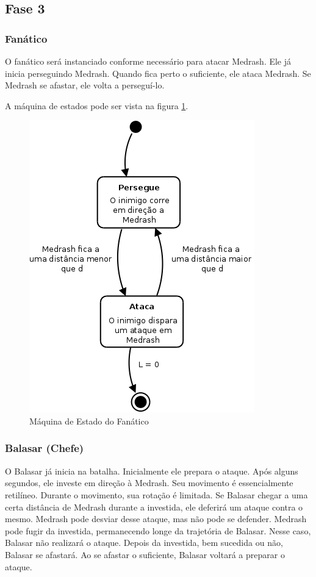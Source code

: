 \subsection{Fase 3}

\subsubsection{Fanático}

O fanático será instanciado conforme necessário para atacar Medrash.
Ele já inicia perseguindo Medrash. Quando fica perto o suficiente, ele
ataca Medrash. Se Medrash se afastar, ele volta a perseguí-lo.

A máquina de estados pode ser vista na figura \ref{fsm:fanatico}.

\begin{figure}[!ht]
 \centering
 \includegraphics[scale=0.35]{ia_fanatico.png}
 \caption{Máquina de Estado do Fanático}
 \label{fsm:fanatico}
\end{figure}

\subsubsection{Balasar (Chefe)}

O Balasar já inicia na batalha. Inicialmente ele prepara o ataque.
Após alguns segundos, ele investe em direção à Medrash. Seu movimento
é essencialmente retilíneo. Durante o movimento, sua rotação é limitada.
Se Balasar chegar a uma certa distância de Medrash durante a investida,
ele deferirá um ataque contra o mesmo. Medrash pode desviar desse ataque,
mas não pode se defender. Medrash pode fugir da investida, permanecendo
longe da trajetória de Balasar. Nesse caso, Balasar não realizará o ataque.
Depois da investida, bem sucedida ou não, Balasar se afastará.
Ao se afastar o suficiente, Balasar voltará a preparar o ataque.

